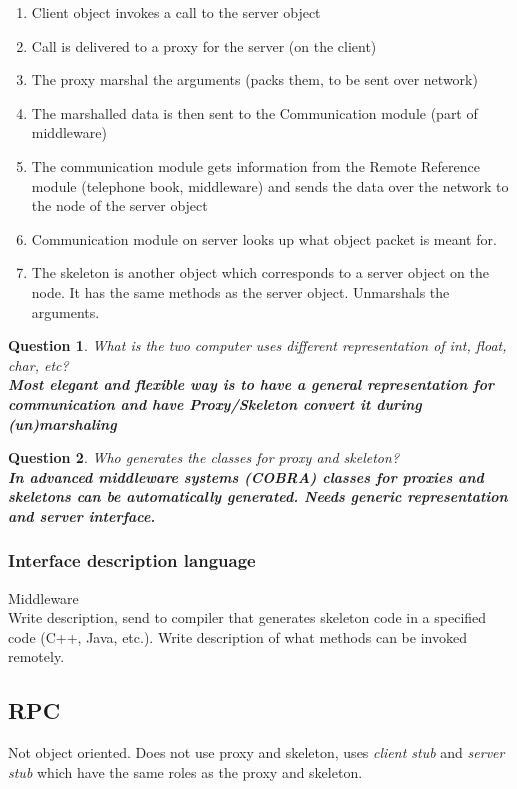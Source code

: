 \documentclass[a4paper]{article}
\newtheorem{question}{Question}
\begin{document}
\begin{enumerate}
	\item Client object invokes a call to the server object
	\item Call is delivered to a proxy for the server (on the client)
	\item The proxy marshal the arguments (packs them, to be sent over
		network)
	\item The marshalled data is then sent to the Communication module (part
		of middleware)
	\item The communication module gets information from the Remote
		Reference module (telephone book, middleware) and sends the data
		over the network to the node of the server object
	\item Communication module on server looks up what object packet is
		meant for.
	\item The skeleton is another object which corresponds to a server
		object on the node. It has the same methods as the server
		object. Unmarshals the arguments.
\end{enumerate}
\begin{question}
What is the two computer uses different representation of int, float, char,
etc?\\
\textbf{Most elegant and flexible way is to have a general representation for
communication and have Proxy/Skeleton convert it during (un)marshaling}
\end{question}
\begin{question}
	Who generates the classes for proxy and skeleton?\\
	\textbf{In advanced middleware systems (COBRA) classes for proxies and
	skeletons can be automatically generated. Needs generic representation
and server interface.}
\end{question}

\subsubsection{Interface description language}
Middleware\\
Write description, send to compiler that generates skeleton code in a specified
code (C++, Java, etc.). Write description of what methods can be invoked
remotely.

\subsection{RPC}
Not object oriented. Does not use proxy and skeleton, uses \textit{client stub}
and \textit{server stub} which have the same roles as the proxy and skeleton.
\end{document}
